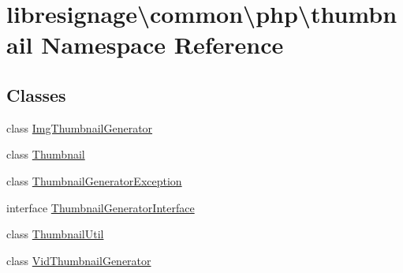 \hypertarget{namespacelibresignage_1_1common_1_1php_1_1thumbnail}{}\section{libresignage\textbackslash{}common\textbackslash{}php\textbackslash{}thumbnail Namespace Reference}
\label{namespacelibresignage_1_1common_1_1php_1_1thumbnail}
\subsection*{Classes}
\begin{DoxyCompactItemize}
\item 
class \hyperlink{classlibresignage_1_1common_1_1php_1_1thumbnail_1_1ImgThumbnailGenerator}{Img\+Thumbnail\+Generator}
\item 
class \hyperlink{classlibresignage_1_1common_1_1php_1_1thumbnail_1_1Thumbnail}{Thumbnail}
\item 
class \hyperlink{classlibresignage_1_1common_1_1php_1_1thumbnail_1_1ThumbnailGeneratorException}{Thumbnail\+Generator\+Exception}
\item 
interface \hyperlink{interfacelibresignage_1_1common_1_1php_1_1thumbnail_1_1ThumbnailGeneratorInterface}{Thumbnail\+Generator\+Interface}
\item 
class \hyperlink{classlibresignage_1_1common_1_1php_1_1thumbnail_1_1ThumbnailUtil}{Thumbnail\+Util}
\item 
class \hyperlink{classlibresignage_1_1common_1_1php_1_1thumbnail_1_1VidThumbnailGenerator}{Vid\+Thumbnail\+Generator}
\end{DoxyCompactItemize}
